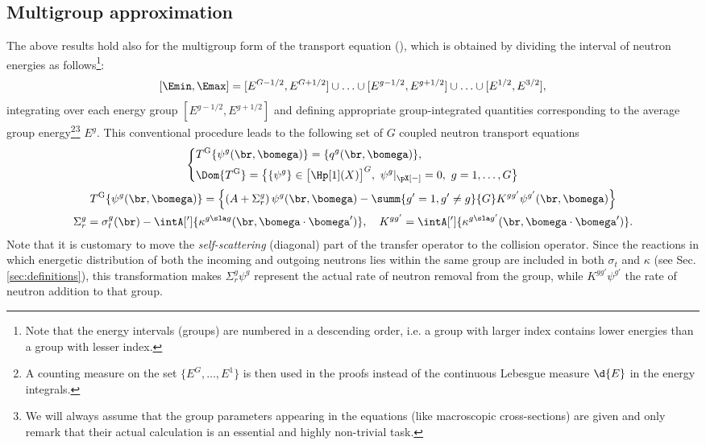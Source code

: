 \subsection{Multigroup approximation}\label{sec:MG}
The above results hold also for the multigroup form of the transport equation (\cite[Chap. XXI, \S1]{DautrayLions}),
which is obtained by dividing the interval of neutron energies as follows\footnote{Note that the energy intervals
(groups) are numbered in a descending order, i.e. a group with larger index contains lower energies than a group with
lesser index.}:
$$
  [\Emin,\Emax] = [E^{G-{1/2}},E^{G+{1/2}}]\cup \ldots \cup [E^{g-1/2}, E^{g+1/2}] \cup \ldots \cup [E^{1/2},E^{3/2}],
$$ integrating  over each energy group $[E^{g-1/2}, E^{g+1/2}]$ and defining appropriate
group-integrated quantities corresponding to the average group energy\footnote{A counting measure on the set
$\{E^G,\ldots,E^1\}$ is then used in the proofs instead of the continuous Lebesgue measure $\d{E}$ in the energy
integrals.}\footnote{We will always assume that the group parameters appearing in the equations (like macroscopic
cross-sections) are given and only remark that their actual calculation is an essential and highly non-trivial task.}
$E^g$. This conventional procedure leads to the following set of $G$ coupled neutron transport equations
\begin{equation}\label{eq:mg}
  \begin{gathered}
	\left\{
	  \begin{aligned}
      &T^\text{G}\{\psi^g(\br,\bomega)\} = \{q^g(\br,\bomega)\},\\
      &\Dom{T^\text{G}} = \bigl\{\{\psi^g\}\in \bigl[\Hp[1](X)\bigr]^G,\ \psi^g\vert_{\pX[-]} = 0,\ g = 1,\ldots,G\bigr\}
    \end{aligned}
  \right.\\[.2em]
    T^\text{G}\{\psi^g(\br,\bomega)\} = \left\{\left(A + \Sigma_r^g\right)\psi^g(\br,\bomega) - \summ{g'=1,g'\neq g}{G} K^{gg'}\psi^{g'}(\br,\bomega)\right\}\\
    \Sigma_r^g = \sigma_t^g(\br) - \intA[']{\kappa^{g\sla g}(\br,\bomega\cdot\bomega')},\quad K^{gg'} = \intA[']{\kappa^{g\sla g'}(\br,\bomega\cdot\bomega')}.
  \end{gathered}
\end{equation}
Note that it is customary to move the \textit{self-scattering} (diagonal) part of the transfer operator to the collision 
operator. Since the reactions in which energetic distribution of both the incoming and outgoing neutrons lies within the 
same group are included in both $\sigma_t$ and $\kappa$ (see Sec. \ref{sec:definitions}), this transformation makes 
$\Sigma_r^g\psi^g$ represent the actual rate of neutron removal from the group, while $K^{gg'}\psi^{g'}$ the rate of 
neutron addition to that group.

